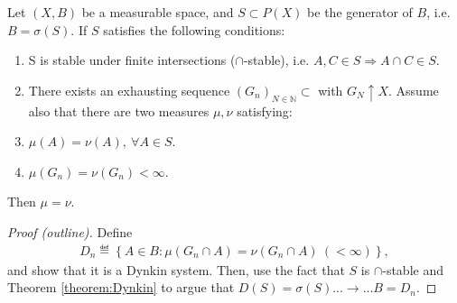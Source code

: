 \begin{theorem}
    Let \((X, B)\) be a measurable space, and \(S\subset P(X)\) be the generator of \(B\), i.e. \(B=\sigma(S)\). If \(S\) satisfies
    the following conditions:
    \begin{enumerate}
        \item S is stable under finite intersections (\(\cap\)-stable), i.e. \(A,C \in S \Rightarrow A\cap C \in S\).
        \item There exists an exhausting sequence \(\left(G_n\right)_{N\in\mathbb{N}} \subset\) with \(G_N\uparrow X\).
        Assume also that there are two measures \(\mu, \nu\) satisfying:
        \item \(\mu(A) = \nu(A), \ \forall A\in S\).
        \item \(\mu(G_n)=\nu(G_n) < \infty\).
    \end{enumerate}
    Then \(\mu = \nu\).
\end{theorem}
\begin{proof}[Proof (outline)]
    Define
    \begin{align*}
        D_n \eqdef \left\{ A \in B : \mu(G_n\cap A) = \nu(G_n\cap A) \ (< \infty) \right\},
    \end{align*}
    and show that it is a Dynkin system. Then, use the fact that \(S\) is \(\cap\)-stable and Theorem \ref{theorem:Dynkin} to argue that
    \(D(S) = \sigma(S)\)...\(\rightarrow\)...\(B=D_n\).
\end{proof}
